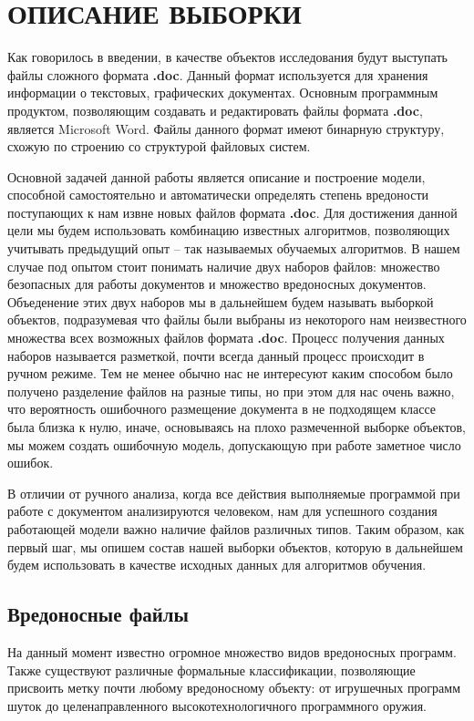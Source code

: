 \chapter{ОПИСАНИЕ ВЫБОРКИ}

Как говорилось в введении, в качестве объектов исследования будут выступать файлы сложного формата \textbf{.doc}.
Данный формат используется для хранения информации о текстовых, графических документах.
Основным программным продуктом, позволяющим создавать и редактировать файлы формата \textbf{.doc}, является Microsoft Word.
Файлы данного формат имеют бинарную структуру, схожую по строению со структурой файловых систем. \cite{doc_format}

Основной задачей данной работы является описание и построение модели, способной самостоятельно и автоматически определять степень вредоности поступающих к нам извне новых файлов формата \textbf{.doc}.
Для достижения данной цели мы будем использовать комбинацию известных алгоритмов, позволяющих учитывать предыдущий опыт -- так называемых обучаемых алгоритмов.
В нашем случае под опытом стоит понимать наличие двух наборов файлов: множество безопасных для работы документов и множество вредоносных документов.
Объеденение этих двух наборов мы в дальнейшем будем называть выборкой объектов, подразумевая что файлы были выбраны из некоторого нам неизвестного множества всех возможных файлов формата \textbf{.doc}. 
Процесс получения данных наборов называется разметкой, почти всегда данный процесс происходит в ручном режиме.
Тем не менее обычно нас не интересуют каким способом было получено разделение файлов на разные типы, но при этом для нас очень важно, что вероятность ошибочного размещение документа в не подходящем классе была близка к нулю, иначе, основываясь на плохо размеченной выборке объектов, мы можем создать ошибочную модель, допускающую при работе заметное число ошибок.

В отличии от ручного анализа, когда все действия выполняемые программой при работе с документом анализируются человеком, нам для успешного создания работающей модели важно наличие файлов различных типов.
Таким образом, как первый шаг, мы опишем состав нашей выборки объектов, которую в дальнейшем будем использовать в качестве исходных данных для алгоритмов обучения.

\section{Вредоносные файлы}

На данный момент известно огромное множество видов вредоносных программ.
Также существуют различные формальные классификации, позволяющие присвоить метку почти любому вредоносному объекту: от игрушечных программ шуток до целенаправленного высокотехнологичного программного оружия.

